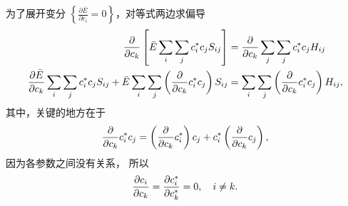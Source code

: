 为了展开变分 $\left\{\frac{\partial \bar E}{\partial c_i} = 0\right\}$，对等式两边求偏导
\begin{align}
    \pdv{c_k} \left[
        \bar E \sum_i \sum_j c_i^* c_j S_{ij}
        \right]
    &= \pdv{c_k} \sum_j \sum_j c_i^* c_j H_{ij} \notag\\
    \pdv{\bar E}{c_k} \sum_i \sum_j c_i^* c_j S_{ij} + 
    \bar E
    \sum_i \sum_j \left(\pdv{c_k}c_i^* c_j\right) S_{ij} &= 
    \sum_i \sum_j \left(\pdv{c_k}c_i^* c_j\right) H_{ij},
    \label{eq:perb_vari_dedci_1}
\end{align}
其中，关键的地方在于
\begin{align}
    \pdv{c_k} c_i^* c_j = \left(\pdv{c_k}c_i^*\right) c_j + c_i^* \left(\pdv{c_k} c_j\right),
\end{align}
因为各参数之间没有关系，
所以
\begin{align}
    \pdv{c_i}{c_k} = \pdv{c_i^*}{c_k^*} = 0, \quad i\neq k. 
\end{align}
